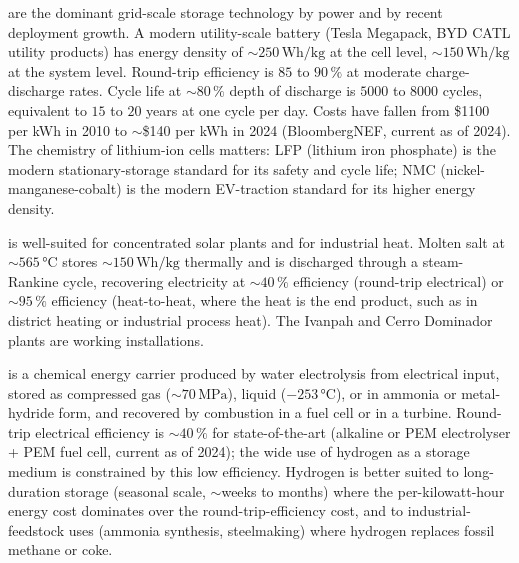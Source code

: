  are the dominant grid-scale storage
technology by power and by recent deployment growth. A modern
utility-scale battery (Tesla Megapack, BYD CATL utility products) has
energy density of $\sim 250\,\si{\watt\hour\per\kilogram}$ at the
cell level, $\sim 150\,\si{\watt\hour\per\kilogram}$ at the system
level. Round-trip efficiency is $85$ to $90\,\%$ at moderate
charge-discharge rates. Cycle life at $\sim 80\,\%$ depth of discharge
is $5000$ to $8000$ cycles, equivalent to $15$ to $20$ years at one
cycle per day. Costs have fallen from \$1100 per kWh
in 2010 to $\sim$\$140 per kWh in 2024 (BloombergNEF, current as
of 2024). The chemistry of lithium-ion cells matters: LFP (lithium
iron phosphate) is the modern stationary-storage standard for its
safety and cycle life; NMC (nickel-manganese-cobalt) is the modern
EV-traction standard for its higher energy density.

 is well-suited for concentrated solar
plants and for industrial heat. Molten salt at $\sim 565\,\si{\celsius}$
stores $\sim 150\,\si{\watt\hour\per\kilogram}$ thermally and is
discharged through a steam-Rankine cycle, recovering electricity at
$\sim 40\,\%$ efficiency (round-trip electrical) or $\sim 95\,\%$
efficiency (heat-to-heat, where the heat is the end product, such as
in district heating or industrial process heat). The Ivanpah and
Cerro Dominador plants are working installations.

 is a chemical energy carrier produced by water
electrolysis from electrical input, stored as compressed gas
($\sim 70\,\si{\mega\pascal}$), liquid ($-253\,\si{\celsius}$), or
in ammonia or metal-hydride form, and recovered by combustion in a
fuel cell or in a turbine. Round-trip electrical efficiency is $\sim
40\,\%$ for state-of-the-art (alkaline or PEM electrolyser + PEM
fuel cell, current as of 2024); the wide use of hydrogen as a
storage medium is constrained by this low efficiency. Hydrogen is
better suited to long-duration storage (seasonal scale, $\sim$weeks
to months) where the per-kilowatt-hour energy cost dominates over
the round-trip-efficiency cost, and to industrial-feedstock uses
(ammonia synthesis, steelmaking) where hydrogen replaces fossil
methane or coke.

